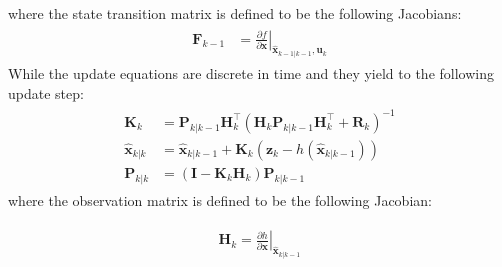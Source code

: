 where the state transition matrix is defined to be the following Jacobians:
\begin{align}
\begin{split}
\boldsymbol{F}_{k-1}&= \left.{\frac{\partial f}{\partial {\boldsymbol{x}}}} \right \vert_{\hat{\boldsymbol{x}}_{k-1|k-1},\boldsymbol{u}_{k}} 
\end{split}
\end{align}
While the update equations are discrete in time and they yield to the following update step: 
\begin{align}
\begin{split}
\boldsymbol{K}_{k} &= \boldsymbol{P}_{k|k-1} \boldsymbol{H}_{k}^{\top }(\boldsymbol{H}_{k} \boldsymbol{P}_{k|k-1} \boldsymbol{H}_{k}^{\top }+ \boldsymbol{R}_{k})^{-1}
\\
\hat{\boldsymbol{x}}_{k|k} &= \hat{\boldsymbol{x}}_{k|k-1} + \boldsymbol{K}_{k} (\boldsymbol{z}_{k}-h(\hat{\boldsymbol{x}}_{k|k-1}))
\\
\boldsymbol{P}_{k|k} &=(\boldsymbol{I}-\boldsymbol{K}_{k}\boldsymbol{H}_{k})\boldsymbol{P}_{k|k-1}
\end{split}
\end{align}
where the observation matrix is defined to be the following Jacobian:

\begin{align}
\begin{split}
\boldsymbol{H}_{k} = \left.{\frac{\partial h}{\partial {\boldsymbol{x}}}} \right \vert_{\hat{\boldsymbol{x}}_{k|k-1}}
\end{split}
\end{align}

